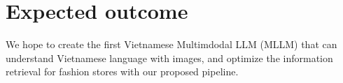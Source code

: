 \section{Expected outcome}

We hope to create the first Vietnamese Multimdodal LLM (MLLM) that can understand Vietnamese language with images, and optimize the information retrieval for fashion stores with our proposed pipeline.